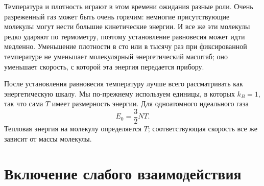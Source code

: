 \begin{classroomqa}   \end{classroomqa}

Температура и плотность играют в этом времени ожидания разные роли. Очень разреженный газ может быть очень горячим: немногие присутствующие молекулы могут нести большие кинетические энергии. И все же эти молекулы редко ударяют по термометру, поэтому установление равновесия может идти медленно. Уменьшение плотности в сто или в тысячу раз при фиксированной температуре не уменьшает молекулярный энергетический масштаб; оно уменьшает скорость, с которой эта энергия передается прибору.

\begin{classroomqa}   \end{classroomqa}

После установления равновесия температуру лучше всего рассматривать как энергетическую шкалу. Мы по-прежнему используем единицы, в которых \(k_B=1\), так что сама \(T\) имеет размерность энергии. Для одноатомного идеального газа \begin{equation}
 E_0=\frac{3}{2}NT.
 \label{eq:sm6-ideal-energy}
\end{equation} Тепловая энергия на молекулу определяется \(T\); соответствующая скорость все же зависит от массы молекулы.

\section{Включение слабого взаимодействия}

